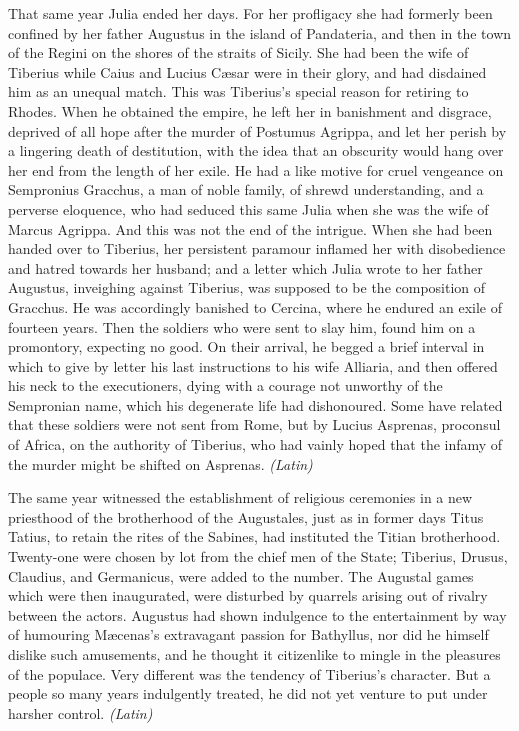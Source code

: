 That same year Julia ended her days. For her profligacy she had formerly been confined by her father Augustus in the island of Pandateria, and then in the town of the Regini on the shores of the straits of Sicily. She had been the wife of Tiberius while Caius and Lucius Cæsar were in their glory, and had disdained him as an unequal match. This was Tiberius's special reason for retiring to Rhodes. When he obtained the empire, he left her in banishment and disgrace, deprived of all hope after the murder of Postumus Agrippa, and let her perish by a lingering death of destitution, with the idea that an obscurity would hang over her end from the length of her exile. He had a like motive for cruel vengeance on Sempronius Gracchus, a man of noble family, of shrewd understanding, and a perverse eloquence, who had seduced this same Julia when she was the wife of Marcus Agrippa. And this was not the end of the intrigue. When she had been handed over to Tiberius, her persistent paramour inflamed her with disobedience and hatred towards her husband; and a letter which Julia wrote to her father Augustus, inveighing against Tiberius, was supposed to be the composition of Gracchus. He was accordingly banished to Cercina, where he endured an exile of fourteen years. Then the soldiers who were sent to slay him, found him on a promontory, expecting no good. On their arrival, he begged a brief interval in which to give by letter his last instructions to his wife Alliaria, and then offered his neck to the executioners, dying with a courage not unworthy of the Sempronian name, which his degenerate life had dishonoured. Some have related that these soldiers were not sent from Rome, but by Lucius Asprenas, proconsul of Africa, on the authority of Tiberius, who had vainly hoped that the infamy of the murder might be shifted on Asprenas. \emph{(Latin)}


The same year witnessed the establishment of religious ceremonies in a new priesthood of the brotherhood of the Augustales, just as in former days Titus Tatius, to retain the rites of the Sabines, had instituted the Titian brotherhood. Twenty-one were chosen by lot from the chief men of the State; Tiberius, Drusus, Claudius, and Germanicus, were added to the number. The Augustal games which were then inaugurated, were disturbed by quarrels arising out of rivalry between the actors. Augustus had shown indulgence to the entertainment by way of humouring Mæcenas's extravagant passion for Bathyllus, nor did he himself dislike such amusements, and he thought it citizenlike to mingle in the pleasures of the populace. Very different was the tendency of Tiberius's character. But a people so many years indulgently treated, he did not yet venture to put under harsher control. \emph{(Latin)}

